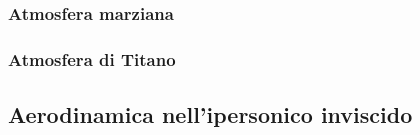 \documentclass[10pt]{article}
\begin{document}
\subsubsection{Atmosfera marziana}
\subsubsection{Atmosfera di Titano}

\subsection{Aerodinamica nell'ipersonico inviscido}


\begin{comment}
\section{Conclusion}
``I always thought something was fundamentally wrong with the universe'' \citep{adams1995hitchhiker}



\end{comment}
\end{document}
